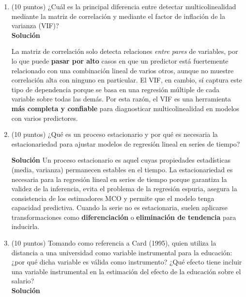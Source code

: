 \documentclass[10pt,a4paper]{article}
\begin{document}
\begin{enumerate}

\item (10 puntos) ¿Cuál es la principal diferencia entre detectar multicolinealidad 
mediante la matriz de correlación y mediante el factor de inflación 
de la varianza (VIF)?
\\
\textbf{Solución}

La matriz de correlación solo detecta relaciones \emph{entre pares} de variables, por lo que puede \textbf{pasar por alto} casos en que un predictor está fuertemente relacionado con una combinación lineal de varios otros, aunque no muestre correlación alta con ninguno en particular. El VIF, en cambio, sí captura este tipo de dependencia porque se basa en una regresión múltiple de cada variable sobre todas las demás. Por esta razón, el VIF es una herramienta \textbf{más completa y confiable} para diagnosticar multicolinealidad en modelos con varios predictores.

\item (10 puntos) ¿Qué es un proceso estacionario y por qué es necesaria la estacionariedad para ajustar modelos de regresión lineal en series de tiempo?

\textbf{Solución}
Un proceso estacionario es aquel cuyas propiedades estadísticas (media, varianza) permanecen estables en el tiempo. La estacionariedad es necesaria para la regresión lineal en series de tiempo porque garantiza la validez de la inferencia, evita el problema de la regresión espuria, asegura la consistencia de los estimadores MCO y permite que el modelo tenga capacidad predictiva. Cuando la serie no es estacionaria, suelen aplicarse transformaciones como \textbf{diferenciación} o \textbf{eliminación de tendencia} para inducirla.

\item (10 puntos) Tomando como referencia a Card (1995), quien utiliza la distancia a una universidad como variable instrumental para la educación: ¿por qué dicha variable es válida como instrumento? ¿Qué efecto tiene incluir una variable instrumental en la estimación del efecto de la educación sobre el salario?
\\
\textbf{Solución}


\end{enumerate}
\end{document}
